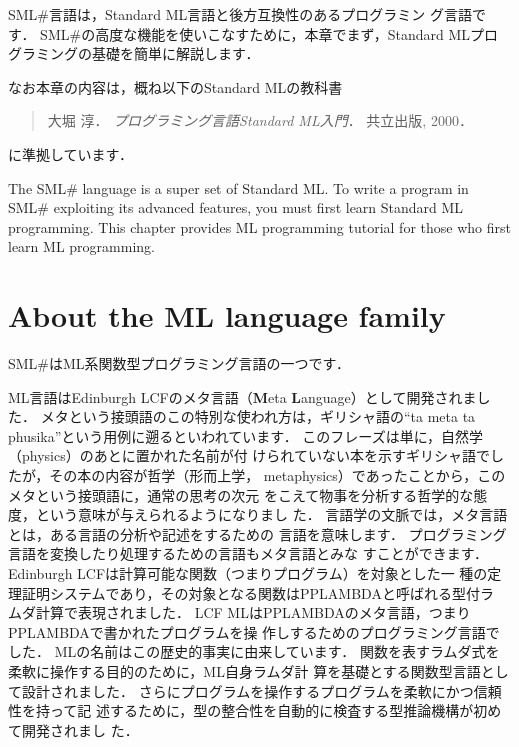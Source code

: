 \documentclass{jbook}
\newcommand{\txt}[2]{#2}
\newcommand{\smlsharp}{SML\#}
\begin{document}
\ifjp%
	\smlsharp{}言語は，Standard ML言語と後方互換性のあるプログラミン
グ言語です．
	\smlsharp{}の高度な機能を使いこなすために，本章でまず，Standard
MLプログラミングの基礎を簡単に解説します．

	なお本章の内容は，概ね以下のStandard MLの教科書
\begin{quote}
大堀 淳．
{\em プログラミング言語Standard ML入門}．
共立出版, 2000．
\end{quote}
に準拠しています．


\else%
	The \smlsharp{} language is a super set of Standard ML.
	To write a program in \smlsharp{} exploiting its advanced
features, you must first learn Standard ML programming.
	This chapter provides ML programming tutorial for those who
first learn ML programming.


\fi%

\section{\txt{ML言語について}{About the ML language family}}
\label{sec:tutorialMllanguage}

\ifjp%
	\smlsharp{}はML系関数型プログラミング言語の一つです．

	ML言語はEdinburgh LCF\cite{gord79}のメタ言語（{\bf M}eta {\bf
L}anguage）として開発されました．
	メタという接頭語のこの特別な使われ方は，ギリシャ語の``ta meta ta
phusika''という用例に遡るといわれています．
	このフレーズは単に，自然学（physics）のあとに置かれた名前が付
けられていない本を示すギリシャ語でしたが，その本の内容が哲学（形而上学，
metaphysics）であったことから，このメタという接頭語に，通常の思考の次元
をこえて物事を分析する哲学的な態度，という意味が与えられるようになりまし
た．
	言語学の文脈では，メタ言語とは，ある言語の分析や記述をするための
言語を意味します．
	プログラミング言語を変換したり処理するための言語もメタ言語とみな
すことができます．
	Edinburgh LCFは計算可能な関数（つまりプログラム）を対象とした一
種の定理証明システムであり，その対象となる関数はPPLAMBDAと呼ばれる型付ラ
ムダ計算で表現されました．
	LCF MLはPPLAMBDAのメタ言語，つまりPPLAMBDAで書かれたプログラムを操
作しするためのプログラミング言語でした．
	MLの名前はこの歴史的事実に由来しています．
	関数を表すラムダ式を柔軟に操作する目的のために，ML自身ラムダ計
算を基礎とする関数型言語として設計されました．
	さらにプログラムを操作するプログラムを柔軟にかつ信頼性を持って記
述するために，型の整合性を自動的に検査する型推論機構が初めて開発されまし
た．
\end{document}
